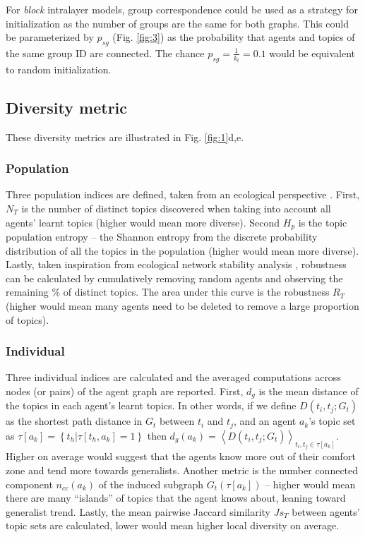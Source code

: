 \documentclass{svproc}
\begin{document}
For \textit{block} intralayer models, group correspondence could be used as a strategy for initialization as the number of groups are the same for both graphs.
This could be parameterized by $p_{sg}$ (Fig. \ref{fig:3}) as the probability that agents and topics of the same group ID are connected.
The chance $p_{sg} = \frac{1}{k_t} = 0.1$ would be equivalent to random initialization.

\subsection{Diversity metric} \label{sec:method-diversity}

These diversity metrics are illustrated in Fig. \ref{fig:1}d,e.

\vspace{-1em}
\subsubsection*{Population}

Three population indices are defined, taken from an ecological perspective \cite{Tuomisto2010-pr}.
First, $N_T$ is the number of distinct topics discovered when taking into account all agents' learnt topics (higher would mean more diverse).
Second $H_p$ is the topic population entropy -- the Shannon entropy from the discrete probability distribution of all the topics in the population (higher would mean more diverse).
Lastly, taken inspiration from ecological network stability analysis \cite{Memmott2004-os}, robustness can be calculated by cumulatively removing random agents and observing the remaining \% of distinct topics.
The area under this curve is the robustness $R_T$ (higher would mean many agents need to be deleted to remove a large proportion of topics).

\vspace{-1em}
\subsubsection*{Individual}

Three individual indices are calculated and the averaged computations across nodes (or pairs) of the agent graph are reported.
First, $d_g$ is the mean distance of the topics in each agent's learnt topics. In other words, if we define $D(t_i,t_j;G_t)$ as the shortest path distance in $G_t$ between $t_i$ and $t_j$, and an agent $a_k$'s topic set as $\tau[a_k] = \left\{t_h | \tau[t_h,a_k] = 1 \right\}$ then $d_g(a_k) = \left\langle D(t_i,t_j;G_t)\right\rangle_{t_i, t_j \in \tau[a_k]}$.
Higher on average would suggest that the agents know more out of their comfort zone and tend more towards generalists.
Another metric is the number connected component $n_{cc}(a_k)$ of the induced subgraph $G_t(\tau[a_k])$ -- higher would mean there are many ``islands'' of topics that the agent knows about, leaning toward generalist trend.
Lastly, the mean pairwise Jaccard similarity $Js_T$ between agents' topic sets are calculated, lower would mean higher local diversity on average.
\end{document}
